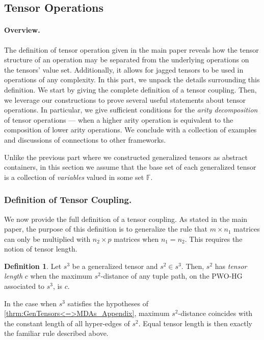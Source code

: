 \documentclass{article}
\theoremstyle{plain}
\theoremstyle{definition}
\newtheorem{definition}[theorem]{Definition}
\theoremstyle{remark}
\let\oldparagraph\paragraph
\renewcommand{\paragraph}[1]{%
	\vspace{-0.5em}%
	\oldparagraph{#1}%
}
\begin{document}
\clearpage

\subsection{Tensor Operations\label{sec:TensorOps}}
\paragraph{Overview.} The definition of tensor operation given in the main paper reveals how the tensor structure of an operation may be separated from the underlying operations on the tensors' value set. Additionally, it allows for jagged tensors to be used in operations of any complexity. In this part, we unpack the details surrounding this definition. We start by giving the complete definition of a tensor coupling. Then, we leverage our constructions to prove several useful statements about tensor operations. In particular, we give sufficient conditions for the \textit{arity decomposition} of tensor operations --- when a higher arity operation is equivalent to the composition of lower arity operations. We conclude with a collection of examples and discussions of connections to other frameworks.

Unlike the previous part where we constructed generalized tensors as abstract containers, in this section we assume that the base set of each generalized tensor is a collection of \textit{variables} valued in some set $\mathbb{F}$.

\subsubsection{\label{sec:TensorOps_Defs}Definition of Tensor Coupling.} We now provide the full definition of a tensor coupling. As stated in the main paper, the purpose of this definition is to generalize the rule that $m \times n_1$ matrices can only be multiplied with $n_2 \times p$ matrices when $n_1 = n_2$. This requires the notion of tensor length.
\begin{definition}
	Let $s^3$ be a generalized tensor and $s^2 \in s^3$. Then, $s^2$ has \textit{tensor length} $c$ when the maximum $s^2$-distance of any tuple path, on the PWO-HG associated to $s^3$, is $c$.
	\label{def:TensorLength}
\end{definition}
In the case when $s^3$ satisfies the hypotheses of \cref{thrm:GenTensors<=>MDAs_Appendix}, maximum $s^2$-distance coincides with the constant length of all hyper-edges of $s^2$. Equal tensor length is then exactly the familiar rule described above.
\end{document}
